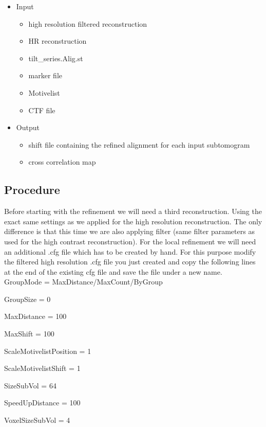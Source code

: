 \documentclass[12pt,a4paper]{scrartcl}
\begin{document}
{\begin{itemize}
	\item Input
	\begin{itemize}
		\item high resolution filtered reconstruction 
		\item HR reconstruction 
		\item tilt\_series.Alig.st 
		\item marker file 
		\item Motivelist
		\item CTF file 
	\end{itemize}
	\item Output
	\begin{itemize}
		\item shift file containing the refined alignment for each input subtomogram
		\item cross correlation map
	\end{itemize} 
\end{itemize}

\subsection{Procedure}
Before starting with the refinement we will need a third reconstruction. Using the exact same settings as we applied for the high resolution reconstruction. The only difference is that this time we are also applying filter (same filter parameters as used for the high contrast reconstruction).
For the local refinement we will need an additional .cfg file which has to be created by hand. For this purpose modify the filtered high resolution .cfg file you just created and copy the following lines at the end of the existing cfg file and save the file under a new name.\\ 

GroupMode = MaxDistance/MaxCount/ByGroup 

GroupSize = 0                         

MaxDistance = 100                      

MaxShift = 100                        

ScaleMotivelistPosition = 1           

ScaleMotivelistShift = 1           

SizeSubVol = 64                      

SpeedUpDistance = 100                 

VoxelSizeSubVol = 4                  

}
\end{document}
